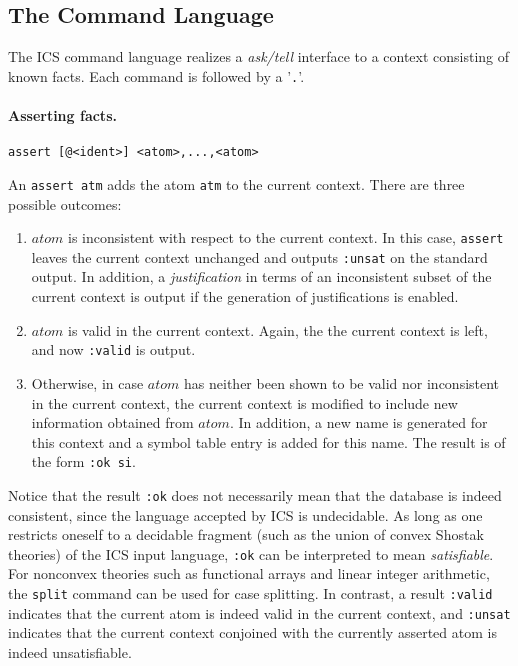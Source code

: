 \documentclass[12pt]{article}
\newcommand{\atom}{\textit{atom}}
\begin{document}
\subsection{The Command Language}

The ICS command language realizes a {\em ask/tell} interface to
a context consisting of known facts. Each command is followed by
a '{\tt .}'\@.

\paragraph{Asserting facts.}\label{cmd:assert}
  \begin{center}
  \texttt{assert [@<ident>] <atom>,...,<atom>}
  \end{center}
An \texttt {assert atm} adds the atom \texttt{atm} to the current context.
There are three possible outcomes:
  \begin{enumerate}
  \item  $\atom$ is inconsistent with respect to the current context.
         In this case, \texttt{assert} leaves the current context
         unchanged and outputs \texttt{:unsat} on the standard
         output. In addition, a {\em justification} in terms of an
         inconsistent subset of the current context is output if
         the generation of justifications is enabled. 
  \item  $\atom$ is valid in the current context. Again, the
         the current context is left, and now \texttt{:valid}
         is output.
  \item  Otherwise, in case $\atom$ has neither been shown to be valid
         nor inconsistent in the current context, the current context is modified to 
         include new information obtained from $\atom$.  In addition, a new name is 
         generated for this context and a symbol table entry is added for this name.
         The result is of the form \texttt{:ok si}\@. 
   \end{enumerate}
  Notice that the result \texttt{:ok} does not necessarily mean that the 
  database is indeed consistent, since the language accepted by ICS is
  undecidable.  As long as one restricts oneself to a decidable fragment
  (such as the union of convex Shostak theories) of the ICS input 
  language, \texttt{:ok} can be interpreted to mean {\em satisfiable}\@.
  For nonconvex theories such as functional arrays and linear integer arithmetic,
  the \texttt{split} command can be used for case splitting. 
  In contrast, a result \texttt{:valid} indicates that the current
  atom is indeed valid in the current context, and \texttt{:unsat} indicates
  that the current context conjoined with the currently asserted atom is
  indeed unsatisfiable.
\end{document}
